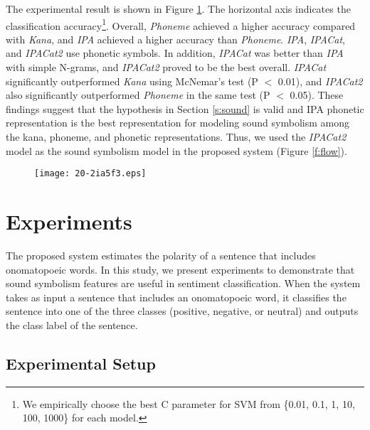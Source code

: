 \documentclass[english]{jnlp_1.4}
\begin{document}
The experimental result is shown in Figure \ref{f:ex1result}.
The horizontal axis indicates the classification accuracy\footnote{We empirically choose the best C parameter for SVM from \{0.01, 0.1, 1, 10, 100, 1000\} for each model.}.
Overall, {\it Phoneme} achieved a higher accuracy compared with {\it Kana}, and {\it IPA} achieved a higher accuracy than {\it Phoneme}.
{\it IPA}, {\it IPACat}, and {\it IPACat2} use phonetic symbols.
In addition, {\it IPACat} was better than {\it IPA} with simple N-grams, and {\it IPACat2} proved to be the best overall.
{\it IPACat} significantly outperformed {\it Kana} using McNemar's test (P $<$ 0.01), and
{\it IPACat2} also significantly outperformed {\it Phoneme} in the same test (P $<$ 0.05).
These findings suggest that the hypothesis in Section \ref{s:sound} is valid and
IPA phonetic representation is the best representation for modeling sound symbolism among the kana, phoneme, and phonetic representations.
Thus, we used the {\it IPACat2} model as the sound symbolism model in the proposed system (Figure \ref{f:flow}).


\begin{figure}[t]
\begin{center}
\texttt{[image: 20-2ia5f3.eps]}
\end{center}
\label{f:ex1result}
\end{figure}

\section{Experiments}
\label{s:ex2}

The proposed system estimates the polarity of a sentence that includes onomatopoeic words.
In this study, we present experiments to demonstrate that sound symbolism features are useful in sentiment classification.
When the system takes as input a sentence that includes an onomatopoeic word, it classifies the sentence into one of the three classes (positive, negative, or neutral) and outputs the class label of the sentence.


\subsection{Experimental Setup}
\label{s:setup2}
\end{document}
